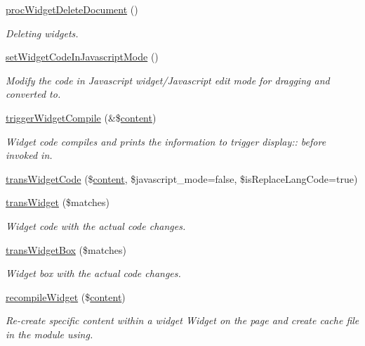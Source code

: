 \begin{DoxyCompactItemize}
\hyperlink{classwidgetController_a9223bf4586acbe9f3262cde3cff193a7}{proc\-Widget\-Delete\-Document} ()
\begin{DoxyCompactList}\small\item\em Deleting widgets. \end{DoxyCompactList}\item 
\hyperlink{classwidgetController_a528aa6c73d47f9149cfe88528d28b5c7}{set\-Widget\-Code\-In\-Javascript\-Mode} ()
\begin{DoxyCompactList}\small\item\em Modify the code in Javascript widget/\-Javascript edit mode for dragging and converted to. \end{DoxyCompactList}\item 
\hyperlink{classwidgetController_acb8488ae3081bdfcf77dbd73740174be}{trigger\-Widget\-Compile} (\&\$\hyperlink{classcontent}{content})
\begin{DoxyCompactList}\small\item\em Widget code compiles and prints the information to trigger display\-:\-: before invoked in. \end{DoxyCompactList}\item 
\hyperlink{classwidgetController_a948e4ce023dc430a42607019bab5d878}{trans\-Widget\-Code} (\$\hyperlink{classcontent}{content}, \$javascript\-\_\-mode=false, \$is\-Replace\-Lang\-Code=true)
\item 
\hyperlink{classwidgetController_ab83211452280836e73df5f7b6acdea82}{trans\-Widget} (\$matches)
\begin{DoxyCompactList}\small\item\em Widget code with the actual code changes. \end{DoxyCompactList}\item 
\hyperlink{classwidgetController_ad406bf4681c3dc1ccf37897479218111}{trans\-Widget\-Box} (\$matches)
\begin{DoxyCompactList}\small\item\em Widget box with the actual code changes. \end{DoxyCompactList}\item 
\hyperlink{classwidgetController_a0f43ca1a0a8bff6d4fe8d8aca50d65e1}{recompile\-Widget} (\$\hyperlink{classcontent}{content})
\begin{DoxyCompactList}\small\item\em Re-\/create specific content within a widget Widget on the page and create cache file in the module using. \end{DoxyCompactList}\item 

\end{DoxyCompactItemize}
